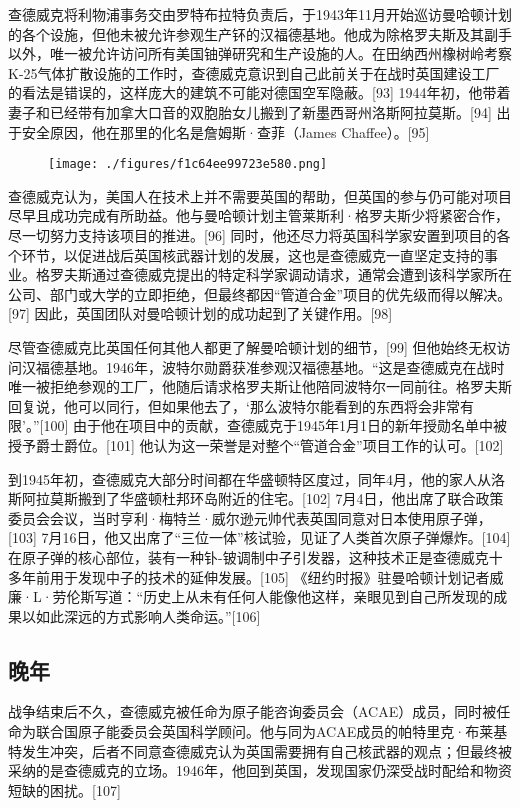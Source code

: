 查德威克将利物浦事务交由罗特布拉特负责后，于1943年11月开始巡访曼哈顿计划的各个设施，但他未被允许参观生产钚的汉福德基地。他成为除格罗夫斯及其副手以外，唯一被允许访问所有美国铀弹研究和生产设施的人。在田纳西州橡树岭考察K-25气体扩散设施的工作时，查德威克意识到自己此前关于在战时英国建设工厂的看法是错误的，这样庞大的建筑不可能对德国空军隐蔽。[93] 1944年初，他带着妻子和已经带有加拿大口音的双胞胎女儿搬到了新墨西哥州洛斯阿拉莫斯。[94] 出于安全原因，他在那里的化名是詹姆斯·查菲（James Chaffee）。[95]
\begin{figure}[ht]
\centering
\texttt{[image: ./figures/f1c64ee99723e580.png]}
\caption{} \label{fig_ZMcdw_7}
\end{figure}
查德威克认为，美国人在技术上并不需要英国的帮助，但英国的参与仍可能对项目尽早且成功完成有所助益。他与曼哈顿计划主管莱斯利·格罗夫斯少将紧密合作，尽一切努力支持该项目的推进。[96] 同时，他还尽力将英国科学家安置到项目的各个环节，以促进战后英国核武器计划的发展，这也是查德威克一直坚定支持的事业。格罗夫斯通过查德威克提出的特定科学家调动请求，通常会遭到该科学家所在公司、部门或大学的立即拒绝，但最终都因“管道合金”项目的优先级而得以解决。[97] 因此，英国团队对曼哈顿计划的成功起到了关键作用。[98]

尽管查德威克比英国任何其他人都更了解曼哈顿计划的细节，[99] 但他始终无权访问汉福德基地。1946年，波特尔勋爵获准参观汉福德基地。“这是查德威克在战时唯一被拒绝参观的工厂，他随后请求格罗夫斯让他陪同波特尔一同前往。格罗夫斯回复说，他可以同行，但如果他去了，‘那么波特尔能看到的东西将会非常有限’。”[100] 由于他在项目中的贡献，查德威克于1945年1月1日的新年授勋名单中被授予爵士爵位。[101] 他认为这一荣誉是对整个“管道合金”项目工作的认可。[102]

到1945年初，查德威克大部分时间都在华盛顿特区度过，同年4月，他的家人从洛斯阿拉莫斯搬到了华盛顿杜邦环岛附近的住宅。[102] 7月4日，他出席了联合政策委员会会议，当时亨利·梅特兰·威尔逊元帅代表英国同意对日本使用原子弹，[103] 7月16日，他又出席了“三位一体”核试验，见证了人类首次原子弹爆炸。[104] 在原子弹的核心部位，装有一种钋-铍调制中子引发器，这种技术正是查德威克十多年前用于发现中子的技术的延伸发展。[105] 《纽约时报》驻曼哈顿计划记者威廉·L·劳伦斯写道：“历史上从未有任何人能像他这样，亲眼见到自己所发现的成果以如此深远的方式影响人类命运。”[106]
\subsection{晚年}
战争结束后不久，查德威克被任命为原子能咨询委员会（ACAE）成员，同时被任命为联合国原子能委员会英国科学顾问。他与同为ACAE成员的帕特里克·布莱基特发生冲突，后者不同意查德威克认为英国需要拥有自己核武器的观点；但最终被采纳的是查德威克的立场。1946年，他回到英国，发现国家仍深受战时配给和物资短缺的困扰。[107]

